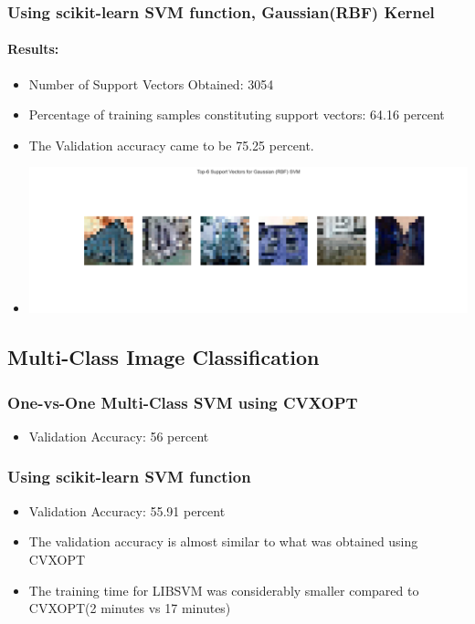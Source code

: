 \documentclass[12pt,a4paper]{article}
\begin{document}
\subsubsection{Using scikit-learn SVM function, Gaussian(RBF) Kernel}
\paragraph{Results:}
\begin{itemize}
    \item Number of Support Vectors Obtained: 3054
    \item Percentage of training samples constituting support vectors: 64.16 percent
    \item The Validation accuracy came to be 75.25 percent.
    \item \includegraphics[width=\textwidth]{Assignment 2/q2/top_6_support_vectors_rbf libsvm rbf.png}
\end{itemize}

\subsection{Multi-Class Image Classification}
\subsubsection{One-vs-One Multi-Class SVM using CVXOPT}
\begin{itemize}
    \item Validation Accuracy: 56 percent
\end{itemize}

\subsubsection{Using scikit-learn SVM function}
\begin{itemize}
    \item Validation Accuracy: 55.91 percent
    \item The validation accuracy is almost similar to what was obtained using CVXOPT
    \item The training time for LIBSVM was considerably smaller compared to CVXOPT(2 minutes vs 17 minutes)
\end{itemize}
\end{document}
